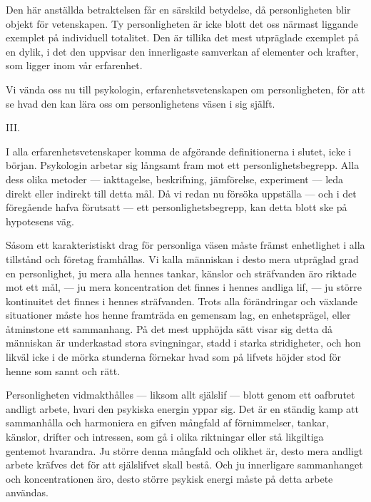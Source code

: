 \documentclass[12pt]{article}
\newcommand{\opage}[1]{\marginnote{\footnotesize\textit{[#1]}}}
\begin{document}
Den här anställda betraktelsen får en %
\opage{27}
särskild betydelse, då personligheten blir objekt för vetenskapen. Ty personligheten är icke blott det oss närmast liggande exemplet på individuell totalitet. Den är tillika det mest utpräglade exemplet på en dylik, i det den uppvisar den innerligaste samverkan af elementer och krafter, som ligger inom vår erfarenhet.

Vi vända oss nu till psykologin, erfarenhetsvetenskapen om personligheten, för att se hvad den kan lära oss om personlighetens väsen i sig själft. %
\opage{28}
\begin{center}\large III.\end{center}

I alla erfarenhetsvetenskaper komma de afgörande definitionerna i slutet, icke i början. Psykologin arbetar sig långsamt fram mot ett personlighetsbegrepp. Alla dess olika metoder --- iakttagelse, beskrifning, jämförelse, experiment --- leda direkt eller indirekt till detta mål. Då vi redan nu försöka uppställa --- och i det föregående hafva förutsatt --- ett personlighetsbegrepp, kan detta blott ske på hypotesens väg.

Såsom ett karakteristiskt drag för personliga väsen måste främst enhetlighet i alla tillstånd och företag framhållas. Vi kalla människan i desto mera utpräglad grad en personlighet, ju mera alla hennes tankar, känslor och sträfvanden äro riktade mot ett mål, --- ju mera koncentration det finnes i hennes andliga lif, --- ju större kontinuitet det finnes i hennes %
\opage{29}
sträfvanden. Trots alla förändringar och växlande situationer måste hos henne framträda en gemensam lag, en enhetsprägel, eller åtminstone ett sammanhang. På det mest upphöjda sätt visar sig detta då människan är underkastad stora svingningar, stadd i starka stridigheter, och hon likväl icke i de mörka stunderna förnekar hvad som på lifvets höjder stod för henne som sannt och rätt.

Personligheten vidmakthålles --- liksom allt själslif --- blott genom ett oafbrutet andligt arbete, hvari den psykiska energin yppar sig. Det är en ständig kamp att sammanhålla och harmoniera en gifven mångfald af förnimmelser, tankar, känslor, drifter och intressen, som gå i olika riktningar eller stå likgiltiga gentemot hvarandra. Ju större denna mångfald och olikhet är, desto mera andligt arbete kräfves det för att själslifvet skall bestå. Och ju innerligare sammanhanget och koncentrationen äro, desto större psykisk energi måste på detta arbete användas.
\end{document}
